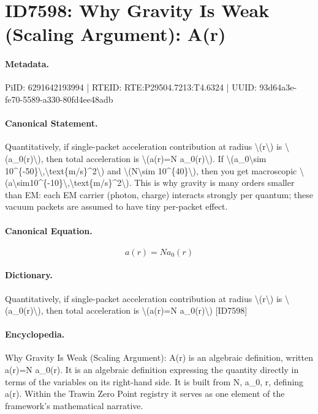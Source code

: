 \section*{ID7598: Why Gravity Is Weak (Scaling Argument): A(r)}
\paragraph{Metadata.}
PiID: 6291642193994 | RTEID: RTE:P29504.7213:T4.6324 | UUID: 93d64a3e-fe70-5589-a330-80fd4ee48adb

\paragraph{Canonical Statement.}
Quantitatively, if single-packet acceleration contribution at radius \textbackslash{}(r\textbackslash{}) is \textbackslash{}(a\_0(r)\textbackslash{}), then total acceleration is \textbackslash{}(a(r)=N a\_0(r)\textbackslash{}). If \textbackslash{}(a\_0\textbackslash{}sim 10\textasciicircum{}\{-50\}\textbackslash{},\textbackslash{}text\{m/s\}\textasciicircum{}2\textbackslash{}) and \textbackslash{}(N\textbackslash{}sim 10\textasciicircum{}\{40\}\textbackslash{}), then you get macroscopic \textbackslash{}(a\textbackslash{}sim10\textasciicircum{}\{-10\}\textbackslash{},\textbackslash{}text\{m/s\}\textasciicircum{}2\textbackslash{}). This is why gravity is many orders smaller than EM: each EM carrier (photon, charge) interacts strongly per quantum; these vacuum packets are assumed to have tiny per-packet effect.

\paragraph{Canonical Equation.}
\[
a(r)=N a_0(r)
\]

\paragraph{Dictionary.}
Quantitatively, if single-packet acceleration contribution at radius \textbackslash{}(r\textbackslash{}) is \textbackslash{}(a\_0(r)\textbackslash{}), then total acceleration is \textbackslash{}(a(r)=N a\_0(r)\textbackslash{}) [ID7598]

\paragraph{Encyclopedia.}
Why Gravity Is Weak (Scaling Argument): A(r) is an algebraic definition, written a(r)=N a\_0(r). It is an algebraic definition expressing the quantity directly in terms of the variables on its right-hand side. It is built from N, a\_0, r, defining a(r). Within the Trawin Zero Point registry it serves as one element of the framework's mathematical narrative.

